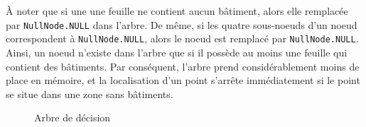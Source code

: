\`{A} noter que si une une feuille ne contient aucun bâtiment, alors elle remplacée par \texttt{NullNode.NULL} dans l'arbre. De même, si les quatre sous-noeuds d'un noeud correspondent à \texttt{NullNode.NULL}, alors le noeud est remplacé par \texttt{NullNode.NULL}. Ainsi, un noeud n'existe dans l'arbre que si il possède au moins une feuille qui contient des bâtiments. Par conséquent, l'arbre prend considérablement moins de place en mémoire, et la localisation d'un point s'arrête immédiatement si le point se situe dans une zone sans bâtiments.

\begin{figure}[h!]
\centering
{}
\label{fig:ArbreDecision}
\caption{Arbre de décision}
\end{figure}